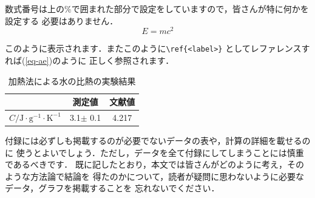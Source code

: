 \documentclass[a4paper,10pt]{jarticle}
\def\rm#1{\mathrm{#1}}
\begin{document}
数式番号は上の\%で囲まれた部分で設定をしていますので，皆さんが特に何かを設定する
必要はありません．
\begin{equation}
 E=mc^2
 \label{eq-ae}
 \end{equation}

このように表示されます．またこのように\verb|\ref{<label>}| としてレファレンスすれば(\ref{eq-ae})のように
正しく参照されます．

%
\begin{table}[ht]
\begin{center}
\caption{加熱法による水の比熱の実験結果}
\label{tabA1}
\begin{tabular}{ccc}\hline
 & 測定値 & 文献値 \\ \hline
$C/\rm{J \cdot g^{-1} \cdot K^{-1}} $ &  3.1$\pm$ 0.1 & 4.217 \\ \hline
\end{tabular}
\end{center}
\end{table}

付録には必ずしも掲載するのが必要でないデータの表や，計算の詳細を載せるのに
使うとよいでしょう．ただし，データを全て付録にしてしまうことには慎重であるべきです．
既に記したとおり，本文では皆さんがどのように考え，そのような方法論で結論を
得たのかについて，読者が疑問に思わないように必要なデータ，グラフを掲載することを
忘れないでください．

\end{document}
